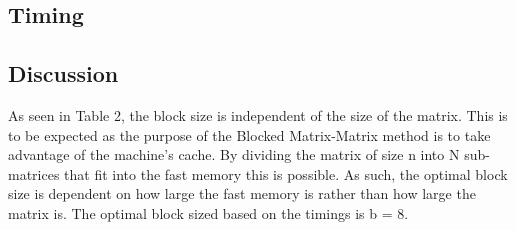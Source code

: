 \documentclass{article}
\begin{document}
\subsection{Timing}
\begin{table}[ht!]
    \caption{Blocked Matrix-Matrix Multiplication Timings (Seconds) on NOTS}
    \centering
\end{table}


\subsection{Discussion}

As seen in Table 2, the block size is independent of the size of the matrix. This is to be expected as the purpose of the Blocked Matrix-Matrix method is to take advantage of the machine's cache. By dividing the matrix of size n into N sub-matrices that fit into the fast memory this is possible. As such, the optimal block size is dependent on how large the fast memory is rather than how large the matrix is. The optimal block sized based on the timings is b = 8.
\end{document}
